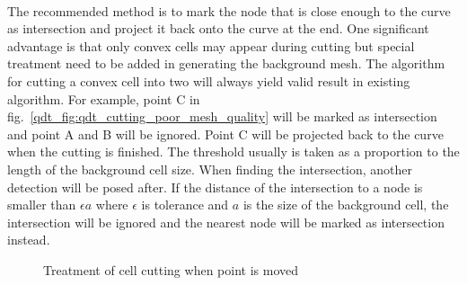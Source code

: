 \paragraph{}
The recommended method is to mark the node that is close enough to the curve as intersection and project it back onto the curve at the end.
One significant advantage is that only convex cells may appear during cutting but special treatment need to be added in generating the background mesh.
The algorithm for cutting a convex cell into two will always yield valid result in existing algorithm.
For example, point C in fig.~\ref{qdt_fig:qdt_cutting_poor_mesh_quality} will be marked as intersection and point A and B will be ignored.
Point C will be projected back to the curve when the cutting is finished.
The threshold usually is taken as a proportion to the length of the background cell size.
When finding the intersection, another detection will be posed after.
If the distance of the intersection to a node is smaller than $\epsilon a$ where $\epsilon$ is tolerance and $a$ is the size of the background cell, the intersection will be ignored and the nearest node will be marked as intersection instead.
\begin{figure}
    \centering
    \caption[Treatment of cell cutting when point is moved]{Treatment of cell cutting when point is moved}
    \label{qdt_fig:qdt_cutting_point_moving_1}
\end{figure}

